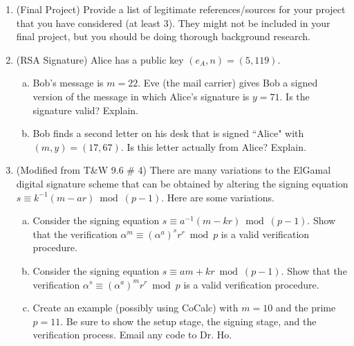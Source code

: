 \documentclass[12pt]{amsart}
\theoremstyle{plain}
\theoremstyle{definition}
\begin{document}
\begin{enumerate}[1.]
	\item (Final Project) Provide a list of legitimate references/sources for your project that you have considered (at least 3).  They might not be included in your final project, but you should be doing thorough background research.
    \begin{framed}
    \vspace{2in}
    \end{framed}
    \item (RSA Signature) Alice has a public key $(e_A, n) = (5, 119)$.
    \begin{enumerate}[a.]
    \item Bob's message is $m = 22$.  Eve (the mail carrier) gives Bob a signed version of the message in which Alice's signature is $y = 71$.  Is the signature valid?  Explain.
    \begin{framed}
   \vspace{1in}
    \end{framed}
    \item Bob finds a second letter on his desk that is signed ``Alice" with $(m,y) = (17,67)$.  Is this letter actually from Alice?  Explain.
    \begin{framed}
    \vspace{1in}
    \end{framed}
    \end{enumerate}
    \item (Modified from T\&W 9.6 \# 4) There are many variations to the ElGamal digital signature scheme that can be obtained by altering the signing equation $s \equiv k^{-1}(m-ar) \bmod (p-1)$.  Here are some variations.
    	\begin{enumerate}[a.]
        	\item Consider the signing equation $s \equiv a^{-1}(m-kr) \bmod (p-1)$.  Show that the verification $\alpha^m \equiv (\alpha^a)^s r^r \bmod p$ is a valid verification procedure.
            \begin{framed}
            \vspace{2in}
            \end{framed}
             \item Consider the signing equation $s \equiv am + kr \bmod (p-1)$.  Show that the verification $\alpha^s \equiv (\alpha^a)^m r^r \bmod p$ is a valid verification procedure.
            \begin{framed}
            \vspace{1.5in}
            \end{framed}
      		\item Create an example (possibly using CoCalc) with $m = 10$ and the prime $p = 11$.  Be sure to show the setup stage, the signing stage, and the verification process.  Email any code to Dr. Ho.
            \begin{framed}
            \vspace{2.5in}
            \end{framed}
        \end{enumerate}
      

\end{enumerate}
\end{document}
